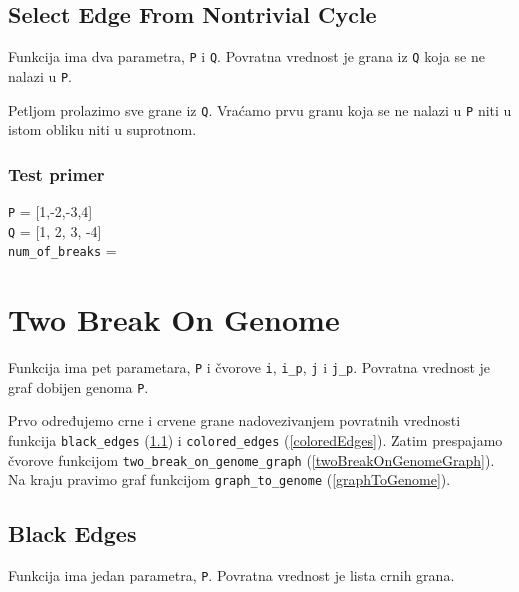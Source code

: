 

\subsection{Select Edge From Nontrivial Cycle}
\label{selectEdgeFromNontravialCycle}


Funkcija ima dva parametra, \texttt{P} i \texttt{Q}. Povratna vrednost je grana iz \texttt{Q} koja se ne nalazi u \texttt{P}.

Petljom prolazimo sve grane iz \texttt{Q}. Vraćamo prvu granu koja se ne nalazi u \texttt{P} niti u istom obliku niti u suprotnom.




\subsubsection{Test primer}

\noindent\texttt{P} =  [1,-2,-3,4]
\\\texttt{Q} = [1, 2, 3, -4]
\\\texttt{num\_of\_breaks} =


\section{Two Break On Genome}

Funkcija ima pet parametara, \texttt{P} i čvorove \texttt{i}, \texttt{i\_p}, \texttt{j} i \texttt{j\_p}. Povratna vrednost je graf dobijen genoma \texttt{P}.

Prvo određujemo crne i crvene grane nadovezivanjem povratnih vrednosti funkcija \texttt{black\_edges} (\ref{blackEdges}) i \texttt{colored\_edges} (\ref{coloredEdges}). Zatim prespajamo čvorove funkcijom \texttt{two\_break\_on\_genome\_graph} (\ref{twoBreakOnGenomeGraph}). Na kraju pravimo graf funkcijom \texttt{graph\_to\_genome} (\ref{graphToGenome}). 



\subsection{Black Edges}
\label{blackEdges}

Funkcija ima jedan parametra, \texttt{P}. Povratna vrednost je lista crnih grana.

